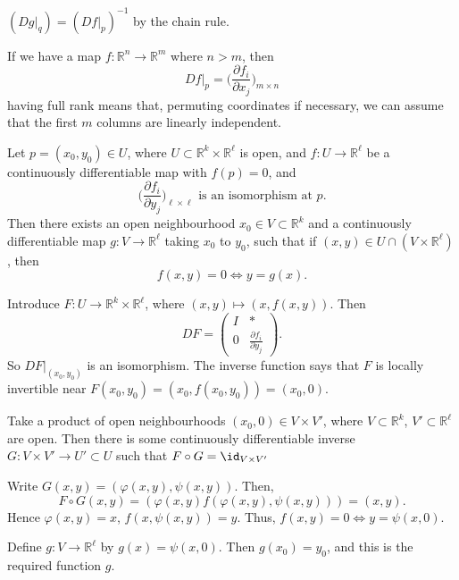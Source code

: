 \documentclass[12pt]{article}
\begin{document}
\begin{remark}
	$(Dg|_q) = (Df|_p)^{-1}$ by the chain rule.
\end{remark}

If we have a map $f : \mathbb{R}^{n} \to \mathbb{R}^{m}$ where $n > m$, then
\[
Df|_p = \biggl( \frac{\partial f_i}{\partial x_j} \biggr)_{m \times n}
\]
having full rank means that, permuting coordinates if necessary, we can assume that the first $m$ columns are linearly independent.

\begin{theorem}
	Let $p = (x_0, y_0) \in U$, where $U \subset \mathbb{R}^{k} \times \mathbb{R}^{\ell}$ is open, and $f : U \to \mathbb{R}^{\ell}$ be a continuously differentiable map with $f(p) = 0$, and
	\[
		\biggl( \frac{\partial f_i}{\partial y_j} \biggr)_{\ell \times \ell} \text{ is an isomorphism at } p
	.\]
	Then there exists an open neighbourhood $x_0 \in V \subset \mathbb{R}^{k}$ and a continuously differentiable map $g : V \to \mathbb{R}^{\ell}$ taking $x_0$ to $y_0$, such that if $(x, y) \in U \cap (V \times \mathbb{R}^{\ell})$, then
	\[
	f(x, y) = 0 \iff y = g(x)
	.\]
\end{theorem}

\begin{proofbox}
	Introduce $F: U \to \mathbb{R}^{k} \times \mathbb{R}^{\ell}$, where $(x, y) \mapsto (x, f(x, y))$. Then
	\[
	DF =
	\begin{pmatrix}
		I & \ast \\
		0 & \frac{\partial f_i}{\partial y_j}
	\end{pmatrix}
	.\]
	So $DF|_{(x_0, y_0)}$ is an isomorphism. The inverse function says that $F$ is locally invertible near $F(x_0, y_0) = (x_0, f(x_0, y_0)) = (x_0, 0)$.

	Take a product of open neighbourhoods $(x_0,0) \in V \times V'$, where $V \subset \mathbb{R}^{k}$, $V' \subset \mathbb{R}^{\ell}$ are open. Then there is some continuously differentiable inverse $G : V \times V' \to U' \subset U$ such that $F \circ G = \id_{V \times V'}$ 

	Write $G(x, y) = (\varphi(x,y), \psi(x, y))$. Then,
	\[
	F \circ G(x, y) = (\varphi(x, y) f(\varphi(x, y), \psi(x,y))) = (x, y)
	.\]
	Hence $\varphi(x, y) = x$, $f(x, \psi(x, y)) = y$. Thus, $f(x, y) = 0 \iff y = \psi(x, 0)$.

	Define $g : V \to \mathbb{R}^{\ell}$ by $g(x) = \psi(x,0)$. Then $g(x_0) = y_0$, and this is the required function $g$.
\end{proofbox}
\end{document}
